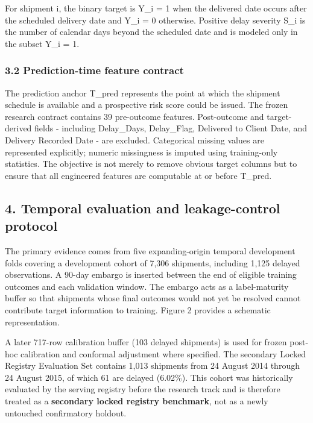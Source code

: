 \documentclass[
]{article}
\begin{document}
For shipment i, the binary target is Y\_i = 1 when the delivered date
occurs after the scheduled delivery date and Y\_i = 0 otherwise.
Positive delay severity S\_i is the number of calendar days beyond the
scheduled date and is modeled only in the subset Y\_i = 1.

\subsubsection{3.2 Prediction-time feature
contract}\label{prediction-time-feature-contract}

The prediction anchor T\_pred represents the point at which the shipment
schedule is available and a prospective risk score could be issued. The
frozen research contract contains 39 pre-outcome features. Post-outcome
and target-derived fields - including Delay\_Days, Delay\_Flag,
Delivered to Client Date, and Delivery Recorded Date - are excluded.
Categorical missing values are represented explicitly; numeric
missingness is imputed using training-only statistics. The objective is
not merely to remove obvious target columns but to ensure that all
engineered features are computable at or before T\_pred.

\subsection{4. Temporal evaluation and leakage-control
protocol}\label{temporal-evaluation-and-leakage-control-protocol}

The primary evidence comes from five expanding-origin temporal
development folds covering a development cohort of 7,306 shipments,
including 1,125 delayed observations. A 90-day embargo is inserted
between the end of eligible training outcomes and each validation
window. The embargo acts as a label-maturity buffer so that shipments
whose final outcomes would not yet be resolved cannot contribute target
information to training. Figure 2 provides a schematic representation.

A later 717-row calibration buffer (103 delayed shipments) is used for
frozen post-hoc calibration and conformal adjustment where specified.
The secondary Locked Registry Evaluation Set contains 1,013 shipments
from 24 August 2014 through 24 August 2015, of which 61 are delayed
(6.02\%). This cohort was historically evaluated by the serving registry
before the research track and is therefore treated as a
\textbf{secondary locked registry benchmark}, not as a newly untouched
confirmatory holdout.
\end{document}
